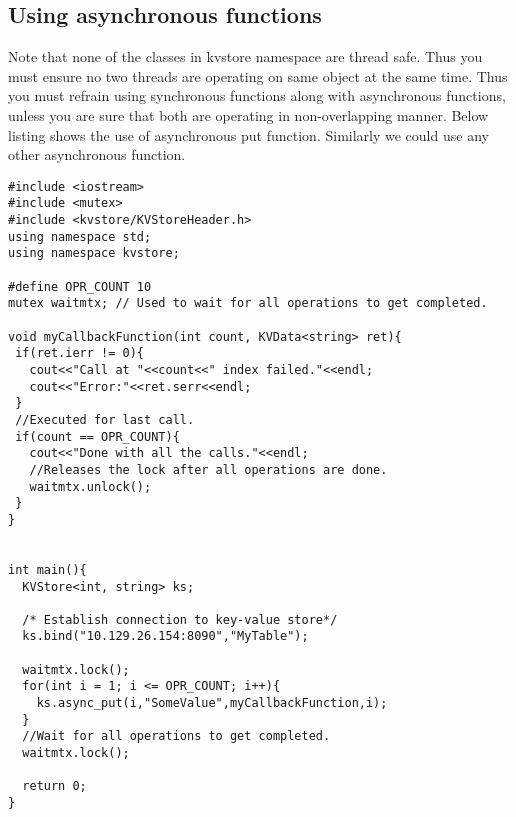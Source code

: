 \documentclass[11pt]{article}
\begin{document}
\subsection{Using asynchronous functions}
Note that none of the classes in kvstore namespace are thread safe. Thus you must ensure no two threads are operating on same object at the same time. Thus you must refrain using synchronous functions along with asynchronous functions, unless you are sure that both are operating in non-overlapping manner. Below listing shows the use of asynchronous put function. Similarly we could use any other asynchronous function.
\begin{lstlisting}
#include <iostream>
#include <mutex>
#include <kvstore/KVStoreHeader.h>
using namespace std;
using namespace kvstore;

#define OPR_COUNT 10
mutex waitmtx; // Used to wait for all operations to get completed.

void myCallbackFunction(int count, KVData<string> ret){
 if(ret.ierr != 0){
   cout<<"Call at "<<count<<" index failed."<<endl;
   cout<<"Error:"<<ret.serr<<endl;
 }
 //Executed for last call.
 if(count == OPR_COUNT){ 
   cout<<"Done with all the calls."<<endl;
   //Releases the lock after all operations are done.
   waitmtx.unlock(); 
 }
}


int main(){
  KVStore<int, string> ks;
  
  /* Establish connection to key-value store*/
  ks.bind("10.129.26.154:8090","MyTable");
  
  waitmtx.lock();
  for(int i = 1; i <= OPR_COUNT; i++){
    ks.async_put(i,"SomeValue",myCallbackFunction,i);
  }
  //Wait for all operations to get completed.
  waitmtx.lock();
  
  return 0;
}
\end{lstlisting}
\end{document}
